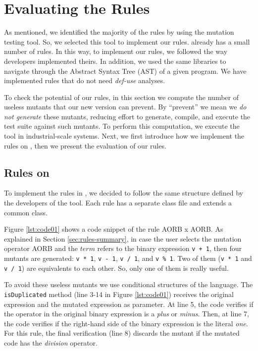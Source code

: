 \chapter{Evaluating the Rules}
\label{sec:implementing}

As mentioned, we identified the majority of the rules by using the \mujava{} mutation testing tool. 
So, we selected this tool to implement our rules. 
\mujava{} already has a small number of rules. 
In this way, to implement our rules, we followed the way \mujava{} developers implemented theirs. 
In addition, we used the same libraries to navigate through the Abstract Syntax Tree (AST) of a given program. 
We have implemented \NumberOfImplementedHeuristics rules that do not need \textit{def-use} analyses.

To check the potential of our rules, in this section we compute the number of useless mutants that our new \mujava{} version can prevent. 
By ``prevent'' we mean we \textit{do not generate} these mutants, reducing effort to generate, compile, and execute the test suite against such mutants.
To perform this computation, we execute the tool in industrial-scale systems.
Next, we first introduce how we implement the rules on \mujava{}, then
we present the evaluation of our rules.

\section{Rules on \mujava{}}
To implement the rules in \mujava{}, we decided to follow the same structure defined by the developers of the tool.
Each rule has a separate class file and extends a common class.

Figure \ref{lst:code01} shows a code snippet of the rule AORB x AORB.
As explained in Section \ref{sec:rules-summary}, in case the user selects the mutation operator AORB and the $term$ refers to the binary expression \texttt{v + 1}, then four mutants are generated: \texttt{v * 1}, \texttt{v - 1}, \texttt{v / 1}, and \texttt{v \% 1}.
Two of them (\texttt{v * 1} and \texttt{v / 1}) are equivalents to each other.
So, only one of them is really useful.

To avoid these useless mutants we use conditional structures of the language.
The \texttt{isDuplicated} method (line 3-14 in Figure \ref{lst:code01}) receives the original expression and the mutated expression as parameter.
At line 5, the code verifies if the operator in the original binary expression is a \textit{plus} or \textit{minus}. 
Then, at line 7, the code verifies if the right-hand side of the binary expression is the literal \textit{one}.
For this rule, the final verification (line 8) discards the mutant if the mutated code has the \textit{division} operator.

